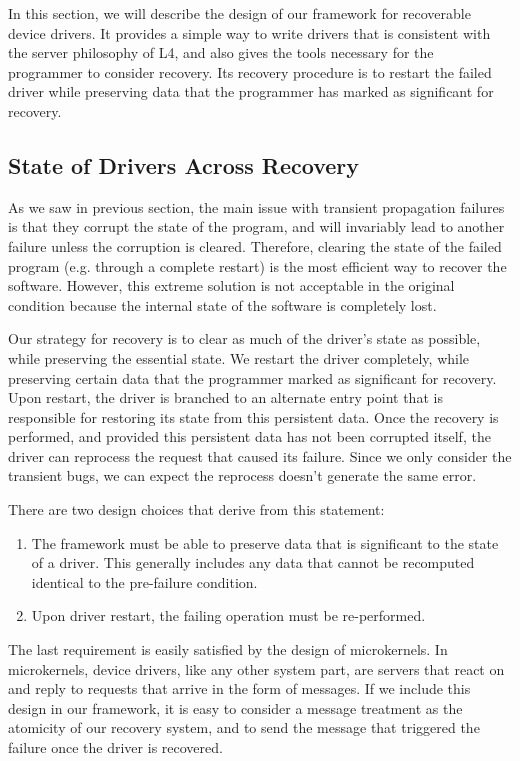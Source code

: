 \documentclass{acm_proc_article-sp}
\begin{document}
In this section, we will describe the design of our framework for recoverable device drivers. It provides a simple way to write drivers that is consistent with the server philosophy of L4, and also gives the tools necessary for the programmer to consider recovery. Its recovery procedure is to restart the failed driver while preserving data that the programmer has marked as significant for recovery.

\subsection{State of Drivers Across Recovery}
\label{s:fw}

As we saw in previous section, the main issue with transient propagation failures is that they corrupt the state of the program, and will invariably lead to another failure unless the corruption is cleared. Therefore, clearing the state of the failed program (e.g. through a complete restart) is the most efficient way to recover the software.  However, this extreme solution is not acceptable in the original condition because the internal state of the software is completely lost.

Our strategy for recovery is to clear as much of the driver's state as possible, while preserving the essential state. We restart the driver completely, while preserving certain data that the programmer marked as significant for recovery.  Upon restart, the driver is branched to an alternate entry point that is responsible for restoring its state from this persistent data. Once the recovery is performed, and provided this persistent data has not been corrupted itself, the driver can reprocess the request that caused its failure.  Since we only consider the transient bugs, we can expect the reprocess doesn't generate the same error.

There are two design choices that derive from this statement:
\begin{enumerate}
\item The framework must be able to preserve data that is significant to the state of a driver. This generally includes any data that cannot be recomputed identical to the pre-failure condition.
\item Upon driver restart, the failing operation must be re-performed.
\end{enumerate}

The last requirement is easily satisfied by the design of microkernels.  In microkernels, device drivers, like any other system part, are servers that react on and reply to requests that arrive in the form of messages. If we include this design in our framework, it is easy to consider a message treatment as the atomicity of our recovery system, and to send the message that triggered the failure once the driver is recovered.
\end{document}
